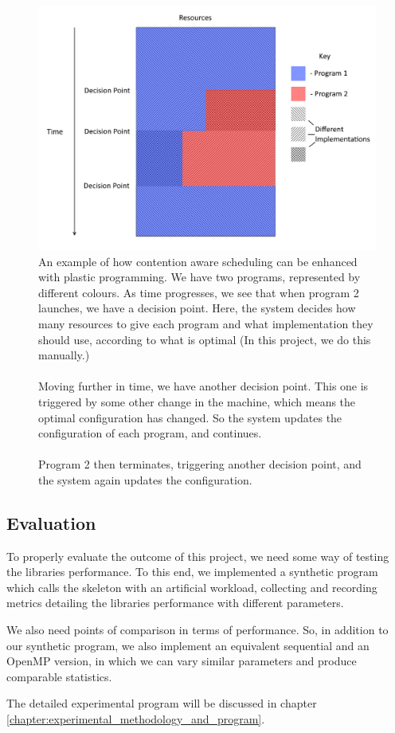 \begin{figure}
	\centering
	\includegraphics[width=\textwidth]{graphics/plastic_contention_aware_scheduling.png}
	\caption{An example of how contention aware scheduling can be enhanced with plastic programming. We have two programs, represented by different colours. As time progresses, we see that when program 2 launches, we have a decision point. Here, the system decides how many resources to give each program and what implementation they should use, according to what is optimal (In this project, we do this manually.) \\ \\ Moving further in time, we have another decision point. This one is triggered by some other change in the machine, which means the optimal configuration has changed. So the system updates the configuration of each program, and continues. \\ \\ Program 2 then terminates, triggering another decision point, and the system again updates the configuration.}
	\label{fig:plastic_contention_aware_scheduling}
\end{figure}



\subsection{Evaluation}

To properly evaluate the outcome of this project, we need some way of testing the libraries performance. To this end, we implemented a synthetic program which calls the skeleton with an artificial workload, collecting and recording metrics detailing the libraries performance with different parameters.  

We also need points of comparison in terms of performance. So, in addition to our synthetic program, we also implement an equivalent sequential and an OpenMP version, in which we can vary similar parameters and produce comparable statistics. 

The detailed experimental program will be discussed in chapter \ref{chapter:experimental_methodology_and_program}.